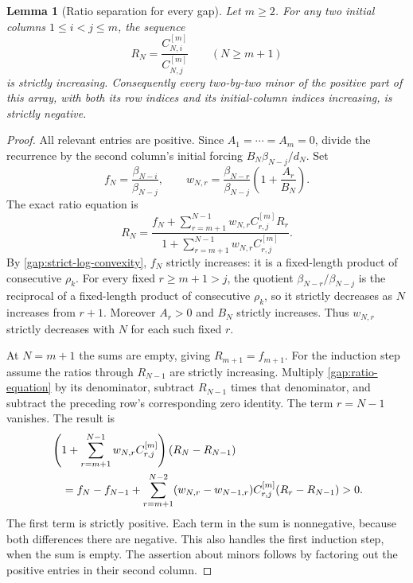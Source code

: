 \documentclass[11pt,letterpaper]{article}
\numberwithin{equation}{section}
\theoremstyle{plain}
\newtheorem{lemma}[theorem]{Lemma}
\theoremstyle{definition}
\theoremstyle{remark}
\begin{document}
\begin{lemma}[Ratio separation for every gap]\label{gap:ratio-lemma}
Let $m\ge2$. For any two initial columns $1\le i<j\le m$, the sequence
\begin{equation}\label{gap:ratio}
 R_N=\frac{C_{N,i}^{[m]}}{C_{N,j}^{[m]}}
       \qquad(N\ge m+1)
\end{equation}
is strictly increasing. Consequently every two-by-two minor of the
positive part of this array, with both its row indices and its
initial-column indices increasing, is strictly negative.
\end{lemma}

\begin{proof}
All relevant entries are positive. Since $A_1=\cdots=A_m=0$,
divide the recurrence by the second column's initial forcing
$B_N\beta_{N-j}/d_N$. Set
\begin{equation}\label{gap:normalized-weights}
 f_N=\frac{\beta_{N-i}}{\beta_{N-j}},\qquad
 w_{N,r}=\frac{\beta_{N-r}}{\beta_{N-j}}
                    \left(1+\frac{A_r}{B_N}\right).
\end{equation}
The exact ratio equation is
\begin{equation}\label{gap:ratio-equation}
 R_N=
 \frac{f_N+\displaystyle\sum_{r=m+1}^{N-1}
                   w_{N,r}C_{r,j}^{[m]}R_r}
      {1+\displaystyle\sum_{r=m+1}^{N-1}
                   w_{N,r}C_{r,j}^{[m]}}.
\end{equation}
By \eqref{gap:strict-log-convexity}, $f_N$ strictly increases: it is
a fixed-length product of consecutive $\rho_k$. For every fixed
$r\ge m+1>j$, the quotient $\beta_{N-r}/\beta_{N-j}$ is the
reciprocal of a fixed-length product of consecutive $\rho_k$,
so it strictly decreases as $N$ increases from $r+1$. Moreover
$A_r>0$ and $B_N$ strictly increases. Thus $w_{N,r}$ strictly
decreases with $N$ for each such fixed $r$.

At $N=m+1$ the sums are empty, giving $R_{m+1}=f_{m+1}$.
For the induction step assume the ratios through $R_{N-1}$ are
strictly increasing. Multiply \eqref{gap:ratio-equation} by its
denominator, subtract $R_{N-1}$ times that denominator, and subtract
the preceding row's corresponding zero identity. The term $r=N-1$
vanishes. The result is
\begin{align}
 &\left(1+\sum_{r=m+1}^{N-1}w_{N,r}C_{r,j}^{[m]}\right)
                 (R_N-R_{N-1})\notag\\
 &\quad=f_N-f_{N-1}
  +\sum_{r=m+1}^{N-2}(w_{N,r}-w_{N-1,r})C_{r,j}^{[m]}
                              (R_r-R_{N-1})>0.
 \label{gap:ratio-increment}
\end{align}
The first term is strictly positive. Each term in the sum is
nonnegative, because both differences there are negative. This
also handles the first induction step, when the sum is empty.
The assertion about minors follows by factoring out the positive
entries in their second column.
\end{proof}
\end{document}
